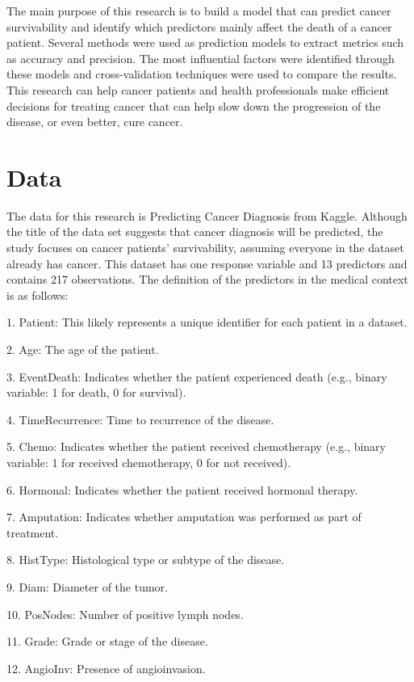 \documentclass[11pt,singlespace]{article}
\begin{document}
	The main purpose of this research is to build a model that can predict cancer survivability and identify which predictors mainly affect the death of a cancer patient. Several methods were used as prediction models to extract metrics such as accuracy and precision. The most influential factors were identified through these models and cross-validation techniques were used to compare the results. This research can help cancer patients and health professionals make efficient decisions for treating cancer that can help slow down the progression of the disease, or even better, cure cancer. 
	
	\section{Data}
	
	The data for this research is Predicting Cancer Diagnosis \cite{Predicting Cancer Diagnosis} from Kaggle. Although the title of the data set suggests that cancer diagnosis will be predicted, the study focuses on cancer patients' survivability, assuming everyone in the dataset already has cancer.  This dataset has one response variable and 13 predictors and contains 217 observations. The definition of the predictors in the medical context is as follows:
	
	1. Patient: This likely represents a unique identifier for each patient in a dataset.
	
	2. Age: The age of the patient.

	3.  EventDeath: Indicates whether the patient experienced death (e.g., binary variable: 1 for death, 0 for survival).
	
	4.  TimeRecurrence: Time to recurrence of the disease.
	
	5.  Chemo: Indicates whether the patient received chemotherapy (e.g., binary variable: 1 for received chemotherapy, 0 for not received).
	
	6.  Hormonal: Indicates whether the patient received hormonal therapy.
	
	7.  Amputation: Indicates whether amputation was performed as part of treatment.
	
	8.  HistType: Histological type or subtype of the disease.
	
	9.  Diam: Diameter of the tumor.
	
	10. PosNodes: Number of positive lymph nodes.
	
	11. Grade: Grade or stage of the disease.
	
	12. AngioInv: Presence of angioinvasion.
	
\end{document}
